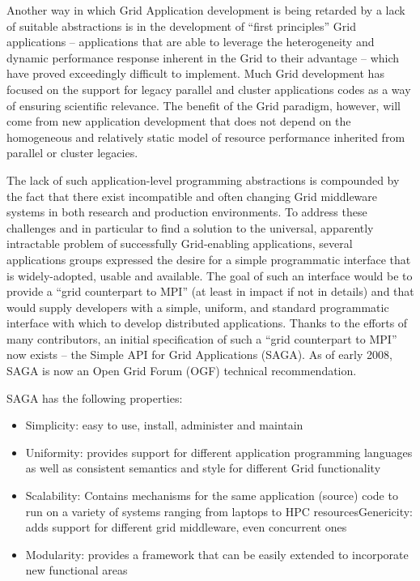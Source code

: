 \documentclass[a4paper,10pt]{article}
\begin{document}
Another way in which Grid Application development is being retarded by a lack of suitable abstractions is 
in the development of ``first principles'' Grid applications -- applications that are able to leverage the 
heterogeneity and dynamic performance response inherent in the Grid to their advantage -- which have 
proved exceedingly difficult to implement.  Much Grid development has focused on the support for legacy 
parallel and cluster applications codes as a way of ensuring scientific relevance.  The benefit of the Grid 
paradigm, however, will come from new application development that does not depend on the 
homogeneous and relatively static model of resource performance inherited from parallel or cluster 
legacies. 

The lack of such application-level programming abstractions is compounded by the fact that there exist 
incompatible and often changing Grid middleware systems in both research and production environments.  
To address these challenges and in particular to find a solution to the universal, apparently intractable 
problem of successfully Grid-enabling applications, several applications groups expressed the desire for a 
simple programmatic interface that is widely-adopted, usable and available.  The goal of such an interface 
would be to provide a ``grid counterpart to MPI'' (at least in impact if not in details) and that would supply 
developers with a simple, uniform, and standard programmatic interface with which to develop distributed 
applications.  Thanks to the efforts of many contributors, an initial specification of such a ``grid counterpart 
to MPI'' now exists -- the Simple API for Grid Applications (SAGA). As of early 2008,
SAGA is now an Open Grid Forum (OGF) technical recommendation.

SAGA has the following properties:

\begin{itemize}
\item Simplicity: easy to use, install, administer and maintain
\item Uniformity: provides support for different application programming languages as well as consistent 
semantics and style for different Grid functionality
\item Scalability: Contains mechanisms for the same application (source) code to run on a variety of 
systems ranging from laptops to HPC resourcesGenericity: adds support for different grid middleware, 
even concurrent ones
\item Modularity: provides a framework that can be easily extended to incorporate new functional areas
\end{itemize}
\end{document}

